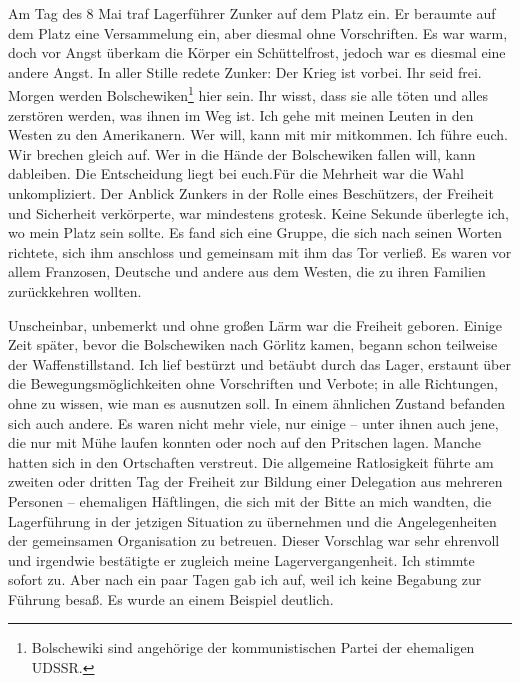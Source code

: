 \documentclass[a4paper,12pt,ngerman,
]{nisebook}
\begin{document}
Am Tag des 8 Mai traf Lagerführer Zunker auf dem Platz ein. Er beraumte auf dem Platz eine Versammelung ein, aber diesmal ohne Vorschriften. Es war warm, doch vor Angst überkam die Körper ein Schüttelfrost, jedoch war es diesmal eine andere Angst. In aller Stille redete Zunker: \glqq Der Krieg ist vorbei. Ihr seid frei. Morgen werden Bolschewiken\footnote{ Bolschewiki sind angehörige der kommunistischen Partei der ehemaligen UDSSR.} hier sein. Ihr wisst, dass sie alle töten und alles zerstören werden, was ihnen im Weg ist. Ich gehe mit meinen Leuten in den Westen zu den Amerikanern. Wer will, kann mit mir mitkommen. Ich führe euch. Wir brechen gleich auf. Wer in die Hände der Bolschewiken fallen will, kann dableiben. Die Entscheidung liegt bei euch.\grqq Für die Mehrheit war die Wahl unkompliziert. Der Anblick Zunkers in der Rolle eines Beschützers, der Freiheit und Sicherheit verkörperte, war mindestens grotesk. Keine Sekunde überlegte ich, wo mein Platz sein sollte. Es fand sich eine Gruppe, die sich nach seinen Worten richtete, sich ihm anschloss und gemeinsam mit ihm das Tor verließ. Es waren vor allem Franzosen, Deutsche und andere aus dem Westen, die zu ihren Familien zurückkehren wollten.

Unscheinbar, unbemerkt und ohne großen Lärm war die Freiheit geboren. Einige Zeit später, bevor die Bolschewiken nach Görlitz kamen, begann schon teilweise der Waffenstillstand. Ich lief bestürzt und betäubt durch das Lager, erstaunt über die Bewegungsmöglichkeiten ohne Vorschriften und Verbote; in alle Richtungen, ohne zu wissen, wie man es ausnutzen soll. In einem ähnlichen Zustand befanden sich auch andere. Es waren nicht mehr viele, nur einige -- unter ihnen auch jene, die nur mit Mühe laufen konnten oder noch auf den Pritschen lagen. Manche hatten sich in den Ortschaften verstreut.
Die allgemeine Ratlosigkeit führte am zweiten oder dritten Tag der Freiheit zur Bildung einer Delegation aus mehreren Personen -- ehemaligen Häftlingen, die sich mit der Bitte an mich wandten, die Lagerführung in der jetzigen Situation zu übernehmen und die Angelegenheiten der gemeinsamen Organisation zu betreuen. Dieser Vorschlag war sehr ehrenvoll und irgendwie bestätigte er zugleich meine Lagervergangenheit. Ich stimmte sofort zu. Aber nach ein paar Tagen gab ich auf, weil ich keine Begabung zur Führung besaß. Es wurde an einem Beispiel deutlich.
\end{document}
